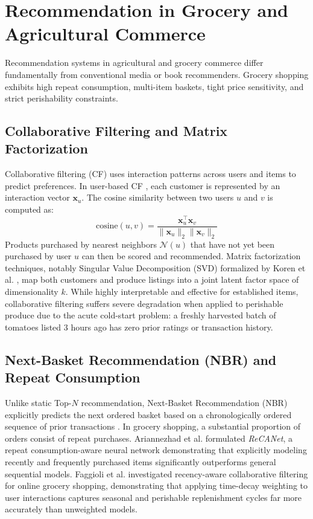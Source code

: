 \section{Recommendation in Grocery and Agricultural Commerce}
\label{sec:LitRev_rec}
Recommendation systems in agricultural and grocery commerce differ fundamentally from conventional media or book recommenders. Grocery shopping exhibits high repeat consumption, multi-item baskets, tight price sensitivity, and strict perishability constraints.

\subsection{Collaborative Filtering and Matrix Factorization}
Collaborative filtering (CF) uses interaction patterns across users and items to predict preferences. In user-based CF \cite{Resnick1994, Sarwar2001}, each customer is represented by an interaction vector $\mathbf{x}_u$. The cosine similarity between two users $u$ and $v$ is computed as:
\begin{equation}
\text{cosine}(u, v) = \frac{\mathbf{x}_u^\top \mathbf{x}_v}{\|\mathbf{x}_u\|_2 \|\mathbf{x}_v\|_2}
\label{eqn:cosine_lit}
\end{equation}
Products purchased by nearest neighbors $\mathcal{N}(u)$ that have not yet been purchased by user $u$ can then be scored and recommended. Matrix factorization techniques, notably Singular Value Decomposition (SVD) formalized by Koren et al. \cite{Koren2009, Koren2010}, map both customers and produce listings into a joint latent factor space of dimensionality $k$. While highly interpretable and effective for established items, collaborative filtering suffers severe degradation when applied to perishable produce due to the acute cold-start problem: a freshly harvested batch of tomatoes listed 3 hours ago has zero prior ratings or transaction history.

\subsection{Next-Basket Recommendation (NBR) and Repeat Consumption}
Unlike static Top-$N$ recommendation, Next-Basket Recommendation (NBR) explicitly predicts the next ordered basket based on a chronologically ordered sequence of prior transactions \cite{Yu2016}. In grocery shopping, a substantial proportion of orders consist of repeat purchases. Ariannezhad et al. \cite{Ariannezhad2022} formulated \textit{ReCANet}, a repeat consumption-aware neural network demonstrating that explicitly modeling recently and frequently purchased items significantly outperforms general sequential models. Faggioli et al. \cite{Faggioli2020} investigated recency-aware collaborative filtering for online grocery shopping, demonstrating that applying time-decay weighting to user interactions captures seasonal and perishable replenishment cycles far more accurately than unweighted models.


